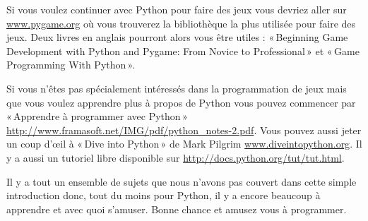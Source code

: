 Si vous voulez continuer avec Python pour faire des jeux vous devriez aller sur \url{www.pygame.org} où vous trouverez la bibliothèque la plus utilisée pour faire des jeux. Deux livres en anglais pourront alors vous être utiles : « Beginning Game Development with Python and Pygame: From Novice to Professional » et « Game Programming With Python ».


Si vous n'êtes pas spécialement intéressés dans la programmation de jeux mais que vous voulez apprendre plus à propos de Python vous pouvez commencer par « Apprendre à programmer avec Python » \url{http://www.framasoft.net/IMG/pdf/python_notes-2.pdf}. Vous pouvez aussi jeter un coup d'œil à « Dive into Python » de Mark Pilgrim \url{www.diveintopython.org}. Il y a aussi un tutoriel libre disponible sur \url{http://docs.python.org/tut/tut.html}.

Il y a tout un ensemble de sujets que nous n'avons pas couvert dans cette simple introduction donc, tout du moins pour Python, il y a encore beaucoup à apprendre et avec quoi s'amuser. Bonne chance et amusez vous à programmer.
 
